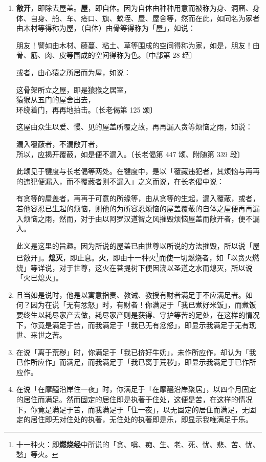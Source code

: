 \begin{enumerate}
\item \textbf{敞开}，即除去屋盖。\textbf{屋}，即自体。因为自体由种种用意而被称为身、洞窟、身体、自身、船、车、疮口、旗、蚁垤、屋、屋舍等，然而在此，如同名为家者由木材等得称为屋，（自体）由骨等得称为「屋」，如说：\begin{quoting}朋友！譬如由木材、藤蔓、粘土、草等围成的空间得称为家，如是，朋友！由骨、筋、肉、皮等围成的空间得称为色。{\bluefootnotesize 〔中部第 28 经〕}\end{quoting}或者，由心猿之所居而为屋，如说：\begin{quoting}这骨架所立之屋，即是猿猴之居室，\\猿猴从五门的屋舍出去，\\环绕着门，再再地拍击。{\bluefootnotesize 〔长老偈第 125 颂〕}\end{quoting}这屋由众生以爱、慢、见的屋盖所覆之故，再再漏入贪等烦恼之雨，如说：\begin{quoting}漏入覆蔽者，不漏敞开者，\\所以，应揭开覆蔽，如是便不漏入。{\bluefootnotesize 〔长老偈第 447 颂、附随第 339 段〕}\end{quoting}此颂见于犍度与长老偈等两处。在犍度中，是以「覆藏违犯者，其烦恼与再再的违犯便漏入，而不覆藏者则不漏入」之义而说，在长老偈中说：\begin{quoting}有贪等的屋盖者，再再于可意的所缘等，由从贪等的生起，漏入覆蔽，或者，若他容忍已生起的烦恼，则他的为所容忍烦恼的屋盖覆蔽的自体之屋便再再漏入烦恼之雨，然而，对于由以阿罗汉道智之风摧毁烦恼屋盖而敞开者，便不漏入。\end{quoting}此义是这里的旨趣。因为所说的屋盖已由世尊以所说的方法摧毁，所以说「屋已敞开」。\textbf{熄灭}，即止息。\textbf{火}，即由十一种火\footnote{十一种火：即\textbf{燃烧经}中所说的「贪、嗔、痴、生、老、死、忧、悲、苦、忧、愁」等火。}而使一切燃烧者，如「以贪火燃烧」等详说，对于世尊，这火在菩提树下便因浇以圣道之水而熄灭，所以说「火已熄灭」。
\item 且当如是说时，他是以寓意指责、教诫、教授有财者满足于不应满足者。如何？因为在说「无有忿怒」时，有财者！你满足于「我已煮好米饭」，而煮饭要终生以耗尽家产去做，耗尽家产则是获得、守护等苦的足处，在这样的情况下，你竟是满足于苦，而我满足于「我已无有忿怒」，即显示我满足于无有现世、来世之苦。
\item 在说「离于荒秽」时，你满足于「我已挤好牛奶」，未作所应作，却认为「我已作所应作」而满足，而我满足于「我已离于荒秽」，即显示我满足于已作所应作。
\item 在说「在摩醯沿岸住一夜」时，你满足于「在摩醯沿岸聚居」，以四个月固定的居住而满足。然而固定的居住即是执著于住处，这便是苦，在这样的情况下，你竟是满足于苦，而我满足于「住一夜」，以无固定的居住而满足，无固定的居住即无对住处的执著，无住处的执著即是乐，即显示我唯满足于乐。

\end{enumerate}
